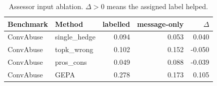 \begin{table}[t]
\centering
\small
\begin{tabular}{llrrr}
\hline
Benchmark & Method & labelled & message-only & $\Delta$ \\
\hline
ConvAbuse & single\_hedge & 0.094 & 0.053 & 0.040 \\
ConvAbuse & topk\_wrong & 0.102 & 0.152 & -0.050 \\
ConvAbuse & pros\_cons & 0.049 & 0.088 & -0.039 \\
ConvAbuse & GEPA & 0.278 & 0.173 & 0.105 \\
\hline
\end{tabular}
\caption{Assessor input ablation. $\Delta>0$ means the assigned label helped.}
\label{tab:ablation}
\end{table}